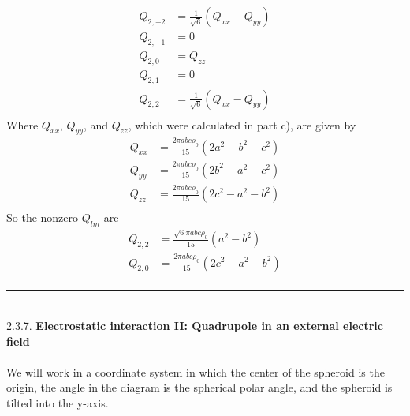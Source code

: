 \documentclass[]{article}
\begin{document}
\begin{enumerate}[c)]
\begin{equation}
\begin{split}
Q_{2,-2} & =  \frac{1}{\sqrt{6}}(Q_{xx}  - Q_{yy}) \\
Q_{2,-1} & = 0 \\
Q_{2,0} & = Q_{zz}\\
Q_{2,1} & = 0 \\
Q_{2,2} & =  \frac{1}{\sqrt{6}}(Q_{xx}  - Q_{yy}) \\
\end{split}
\end{equation}
Where $Q_{xx}$, $Q_{yy}$, and $Q_{zz}$, which were calculated in part c), are given by
\begin{equation}
\begin{split}
Q_{xx} & = \frac{2\pi abc \rho_0 }{15}( 2a^2 -b^2 -c^2) \\
Q_{yy} & = \frac{2\pi abc \rho_0 }{15}( 2b^2 -a^2 -c^2) \\
Q_{zz} & = \frac{2\pi abc \rho_0 }{15}( 2c^2 -a^2 -b^2) \\
\end{split}
\end{equation}
So the nonzero $Q_{lm}$ are
\begin{equation}
\begin{split}
Q_{2,2} & = \frac{\sqrt{6}\pi abc \rho_0 }{15}( a^2 -b^2 ) \\
Q_{2,0} & =  \frac{2\pi abc \rho_0 }{15}( 2c^2 -a^2 -b^2) \\
\end{split}
\end{equation}
\end{enumerate}
\noindent\rule{15cm}{0.4pt} \\
2.3.7. {\bf Electrostatic interaction II: Quadrupole in an
external electric field} \\
\\
We will work in a coordinate system in which the center of the spheroid is the origin, the angle in the diagram is the spherical polar angle, and the spheroid is tilted into the y-axis. 
\end{document}
